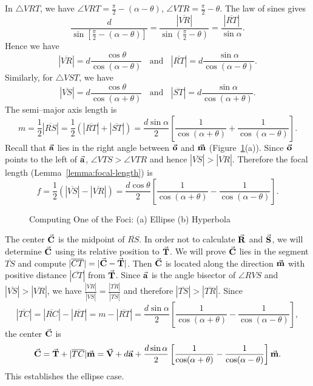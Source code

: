 \fi
In $\bigtriangleup VRT$, we have 
$\angle VRT=\frac{\pi}{2}-(\alpha-\theta)$,
$\angle VTR=\frac{\pi}{2}-\theta$.  The law of sines gives
\[ \frac{d}{\sin\left[\frac{\pi}{2}-(\alpha-\theta)\right]} =
   \frac{|\overline{VR}|}{\sin\left(\frac{\pi}{2}-\theta\right)} =
   \frac{|\overline{RT}|}{\sin\alpha}. \]
Hence we have
\[ |\overline{VR}|=d\frac{\cos\theta}{\cos(\alpha-\theta)}\ \ \ \ \mbox{and}
     \ \ \ \ |\overline{RT}|=d\frac{\sin\alpha}{\cos(\alpha-\theta)}. \]
Similarly, for $\bigtriangleup VST$, we have
\[ |\overline{VS}|=d\frac{\cos\theta}{\cos(\alpha+\theta)}\ \ \ \ \mbox{and}
     \ \ \ \ |\overline{ST}|=d\frac{\sin\alpha}{\cos(\alpha+\theta)}. \]
The semi--major axis length is
\[ m=\frac{1}{2}|\overline{RS}|
  =\frac{1}{2}(|\overline{RT}| + |\overline{ST}|)
  =\frac{d\sin\alpha}{2}\left[ \frac{1}{\cos(\alpha+\theta)}+
                    \frac{1}{\cos(\alpha-\theta)}\right].  \]
Recall that $\vec{\bf a}$ lies in the right angle between $\vec{\bf o}$ and 
$\vec{\bf m}$ (Figure~\ref{fig:ellipse}(a)).  Since $\vec{\bf o}$ points to the 
left of $\vec{\bf a}$, $\angle VTS>\angle VTR$ and 
hence $|\overline{VS}|>|\overline{VR}|$.  
Therefore the focal length (Lemma~\ref{lemma:focal-length}) is
\[ f= \frac{1}{2}(|\overline{VS}| - |\overline{VR}|)
  = \frac{d\cos\theta}{2}\left[ \frac{1}{\cos(\alpha+\theta)}-
                                 \frac{1}{\cos(\alpha-\theta)}\right]. \]

\begin{figure}
\vspace{7cm}
\caption{Computing One of the Foci: (a) Ellipse  (b) Hyperbola}
\label{fig:ellipse}
\end{figure}

     The center $\vec{\bf C}$ is the midpoint of $\overline{RS}$.  In order not
to calculate $\vec{\bf R}$ and $\vec{\bf S}$, we will determine $\vec{\bf C}$
using its relative position to $\vec{\bf T}$.  We will prove $\vec{\bf C}$ lies in
the segment $\overline{TS}$ and compute 
$|\overline{CT}|=|\vec{\bf C}-\vec{\bf T}|$.  Then $\vec{\bf C}$ is located 
along the direction $\vec{\bf m}$ with
positive distance $|\overline{CT}|$ from $\vec{\bf T}$.  
Since $\vec{\bf a}$ is the angle bisector of $\angle RVS$ and
$|\overline{VS}|>|\overline{VR}|$, we have
$\frac{|\overline{VR}|}{|\overline{VS}|}=
\frac{|\overline{TR}|}{|\overline{TS}|}$ and 
therefore $|\overline{TS}|>|\overline{TR}|$.  Since
\[     |\overline{TC}| = |\overline{RC}|-|\overline{RT}| 
                     = m-|\overline{RT}| 
                     = \frac{d\sin\alpha}{2}\left[
                         \frac{1}{\cos(\alpha+\theta)}-
                         \frac{1}{\cos(\alpha-\theta)}\right],   \]
the center $\vec{\bf C}$ is
\[  \vec{\bf C}=\vec{\bf T}+|\overline{TC}|\vec{\bf m}=\vec{\bf V}+d\vec{\bf a}+
          \frac{d\sin\alpha}{2}\left[ \frac{1}{\cos(\alpha+\theta)}-
             \frac{1}{\cos(\alpha-\theta)}\right] \vec{\bf m}. \]
This establishes the ellipse case.
\ifFull

